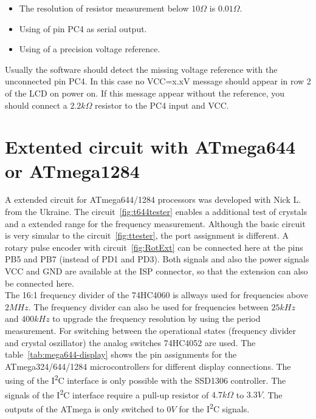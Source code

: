 \begin{description}
\begin{itemize}
 \item The resolution of resistor measurement below \(10\Omega\) is \(0.01\Omega\).
 \item Using of pin PC4 as serial output.
 \item Using of a precision voltage reference.
 \end{itemize}
Usually the software should detect the missing voltage reference with the unconnected pin PC4.
In this case no VCC=x.xV message should appear in row 2 of the LCD on power on.
If this message appear without the reference, you should connect a \(2.2k\Omega\) resistor
to the PC4 input and VCC.

\end{description}


\section{Extented circuit with ATmega644 or ATmega1284}

A extended circuit for ATmega644/1284 processors was developed with Nick L. from the Ukraine.
The circuit~\ref{fig:t644tester} enables a additional test of crystals and a extended range
for the frequency measurement.
Although the basic circuit is very simular to the circuit~\ref{fig:ttester}, the
port assignment is different.
A rotary pulse encoder with circuit~\ref{fig:RotExt} can be connected here at the pins PB5 and PB7 (instead of PD1 and PD3).
Both signals and also the power signals VCC and GND are available at the ISP connector,
so that the extension can also be connected here.\\

The 16:1 frequency divider of the 74HC4060 is allways used for frequencies above \(2MHz\).
The frequency divider can also be used for frequencies between \(25kHz\) and \(400kHz\) to
upgrade the frequency resolution by using the period measurement.
For switching between the operational states (frequency divider and crystal oszillator)
the analog switches 74HC4052 are used.
The table~\ref{tab:mega644-display} shows the pin assignments for the ATmega324/644/1284
microcontrollers for different display connections.
The using of the I\textsuperscript{2}C interface is only possible with the SSD1306 controller.
The signals of the I\textsuperscript{2}C interface require a pull-up resistor of \(4.7k\Omega\) to \(3.3V\).
The outputs of the ATmega is only switched to \(0V\) for the I\textsuperscript{2}C signals.


